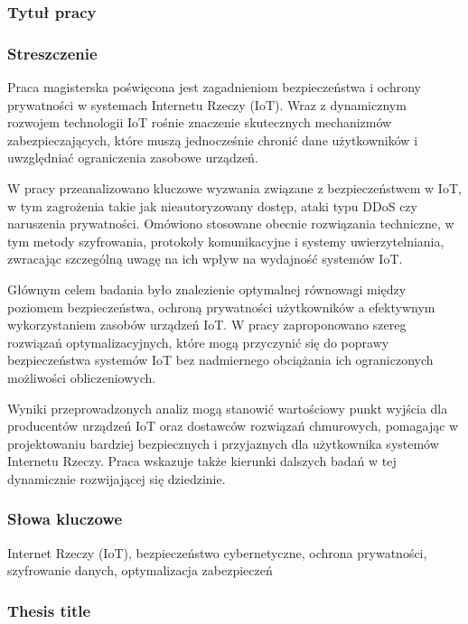 \subsubsection*{Tytuł pracy} 
\Title

\subsubsection*{Streszczenie}  
Praca magisterska poświęcona jest zagadnieniom bezpieczeństwa i ochrony prywatności w systemach Internetu Rzeczy (IoT). Wraz z dynamicznym rozwojem technologii IoT rośnie znaczenie skutecznych mechanizmów zabezpieczających, które muszą jednocześnie chronić dane użytkowników i uwzględniać ograniczenia zasobowe urządzeń.

W pracy przeanalizowano kluczowe wyzwania związane z bezpieczeństwem w IoT, w tym zagrożenia takie jak nieautoryzowany dostęp, ataki typu DDoS czy naruszenia prywatności. Omówiono stosowane obecnie rozwiązania techniczne, w tym metody szyfrowania, protokoły komunikacyjne i systemy uwierzytelniania, zwracając szczególną uwagę na ich wpływ na wydajność systemów IoT.

Głównym celem badania było znalezienie optymalnej równowagi między poziomem bezpieczeństwa, ochroną prywatności użytkowników a efektywnym wykorzystaniem zasobów urządzeń IoT. W pracy zaproponowano szereg rozwiązań optymalizacyjnych, które mogą przyczynić się do poprawy bezpieczeństwa systemów IoT bez nadmiernego obciążania ich ograniczonych możliwości obliczeniowych.

Wyniki przeprowadzonych analiz mogą stanowić wartościowy punkt wyjścia dla producentów urządzeń IoT oraz dostawców rozwiązań chmurowych, pomagając w projektowaniu bardziej bezpiecznych i przyjaznych dla użytkownika systemów Internetu Rzeczy. Praca wskazuje także kierunki dalszych badań w tej dynamicznie rozwijającej się dziedzinie.

\subsubsection*{Słowa kluczowe} 
Internet Rzeczy (IoT), bezpieczeństwo cybernetyczne, ochrona prywatności, szyfrowanie danych, optymalizacja zabezpieczeń
\newpage
\subsubsection*{Thesis title} 
\begin{otherlanguage}{british}
\TitleAlt
\end{otherlanguage}


